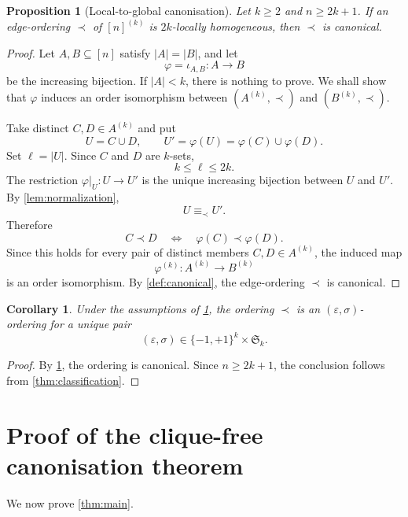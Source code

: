 \documentclass[11pt]{amsart}
\newtheorem{proposition}[theorem]{Proposition}
\newtheorem{corollary}[theorem]{Corollary}
\theoremstyle{definition}
\newcommand{\eps}{\varepsilon}
\newcommand{\Sym}{\mathfrak{S}}
\begin{document}
\begin{proposition}[Local-to-global canonisation]\label{prop:localglobal}
Let $k\ge2$ and $n\ge2k+1$. If an edge-ordering $\prec$ of $[n]^{(k)}$ is $2k$-locally homogeneous, then $\prec$ is canonical.
\end{proposition}

\begin{proof}
Let $A,B\subseteq[n]$ satisfy $|A|=|B|$, and let
\[
\varphi=\iota_{A,B}:A\longrightarrow B
\]
be the increasing bijection. If $|A|<k$, there is nothing to prove. We shall show that $\varphi$ induces an order isomorphism between $(A^{(k)},\prec)$ and $(B^{(k)},\prec)$.

Take distinct $C,D\in A^{(k)}$ and put
\[
U=C\cup D,
\qquad
U'=\varphi(U)=\varphi(C)\cup\varphi(D).
\]
Set $\ell=|U|$. Since $C$ and $D$ are $k$-sets,
\[
k\le\ell\le2k.
\]
The restriction $\varphi|_U:U\to U'$ is the unique increasing bijection between $U$ and $U'$. By \cref{lem:normalization},
\[
U\equiv_{\prec}U'.
\]
Therefore
\[
C\prec D
\quad\Longleftrightarrow\quad
\varphi(C)\prec\varphi(D).
\]
Since this holds for every pair of distinct members $C,D\in A^{(k)}$, the induced map
\[
\varphi^{(k)}:A^{(k)}\longrightarrow B^{(k)}
\]
is an order isomorphism. By \cref{def:canonical}, the edge-ordering $\prec$ is canonical.
\end{proof}

\begin{corollary}\label{cor:classificationlocal}
Under the assumptions of \cref{prop:localglobal}, the ordering $\prec$ is an $(\eps,\sigma)$-ordering for a unique pair
\[
(\eps,\sigma)\in\{-1,+1\}^k\times\Sym_k.
\]
\end{corollary}

\begin{proof}
By \cref{prop:localglobal}, the ordering is canonical. Since $n\ge2k+1$, the conclusion follows from \cref{thm:classification}.
\end{proof}

\section{Proof of the clique-free canonisation theorem}

We now prove \cref{thm:main}.
\end{document}
